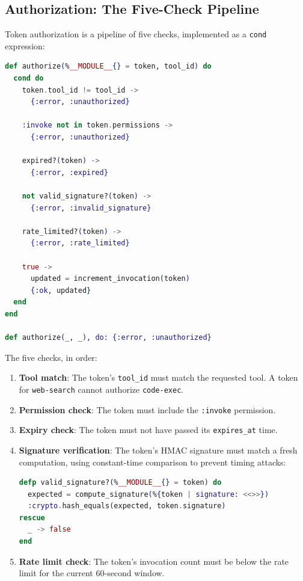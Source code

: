 \documentclass[12pt,a4paper]{article}
\theoremstyle{plain}
\theoremstyle{definition}
\begin{document}
\subsection{Authorization: The Five-Check Pipeline}

Token authorization is a pipeline of five checks, implemented as a \texttt{cond} expression:

\begin{lstlisting}[language=elixir, caption={Five-check authorization pipeline.}, label={lst:authorize}]
def authorize(%__MODULE__{} = token, tool_id) do
  cond do
    token.tool_id != tool_id ->
      {:error, :unauthorized}

    :invoke not in token.permissions ->
      {:error, :unauthorized}

    expired?(token) ->
      {:error, :expired}

    not valid_signature?(token) ->
      {:error, :invalid_signature}

    rate_limited?(token) ->
      {:error, :rate_limited}

    true ->
      updated = increment_invocation(token)
      {:ok, updated}
  end
end

def authorize(_, _), do: {:error, :unauthorized}
\end{lstlisting}

The five checks, in order:

\begin{enumerate}[leftmargin=2em]
\item \textbf{Tool match}: The token's \texttt{tool\_id} must match the requested tool. A token for \texttt{web-search} cannot authorize \texttt{code-exec}.
\item \textbf{Permission check}: The token must include the \texttt{:invoke} permission.
\item \textbf{Expiry check}: The token must not have passed its \texttt{expires\_at} time.
\item \textbf{Signature verification}: The token's HMAC signature must match a fresh computation, using constant-time comparison to prevent timing attacks:
\begin{lstlisting}[language=elixir, caption={Constant-time signature verification.}, label={lst:sig-verify}]
defp valid_signature?(%__MODULE__{} = token) do
  expected = compute_signature(%{token | signature: <<>>})
  :crypto.hash_equals(expected, token.signature)
rescue
  _ -> false
end
\end{lstlisting}
\item \textbf{Rate limit check}: The token's invocation count must be below the rate limit for the current 60-second window.
\end{enumerate}
\end{document}
